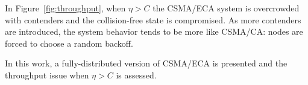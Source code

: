 

In Figure~\ref{fig:throughput}, when $\eta > C$ the CSMA/ECA system is overcrowded with contenders and the collision-free state is compromised. As more contenders are introduced, the system behavior tends to be more like CSMA/CA: nodes are forced to choose a random backoff.

In this work, a fully-distributed version of CSMA/ECA is presented and the throughput issue when $\eta > C$ is assessed.